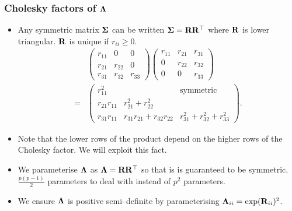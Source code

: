\documentclass{beamer}
\begin{document}
	\begin{frame}
		\frametitle{Cholesky factors of ${\boldsymbol \Lambda}$}
		\begin{itemize}
			\item Any symmetric matrix ${\boldsymbol \Sigma}$ can be written ${\boldsymbol \Sigma} = {\bf R} {\bf R}^\top$
			      where ${\bf R}$ is lower triangular. ${\bf R}$ is unique if $r_{ii} \geq 0$. 
			      \begin{align*}
			      	&\begin{pmatrix}
			      	r_{11}          & 0                                    & 0                                     \\
			      	r_{21}          & r_{22}                             & 0                                     \\
			      	r_{31}          & r_{32}                             & r_{33}                              
			      	\end{pmatrix}
			      	\begin{pmatrix}
			      	r_{11}          & r_{21}                             & r_{31}                              \\
			      	0                 & r_{22}                             & r_{32}                              \\
			      	0                 & 0                                    & r_{33}                              
			      	\end{pmatrix}
			      	\\
			      	=& \begin{pmatrix}
			      	r_{11}^2        &                                      & \text{symmetric}                      \\
			      	r_{21}r_{11} & r_{21}^2 + r_{22}^2 \\
			      	r_{31} r_{11} & r_{31}r_{21} + r_{32} r_{22} & r_{31}^2 + r_{32} ^2 + r_{33}^2 
			      	\end{pmatrix}.
			      \end{align*}
			\item Note that the lower rows of the product depend on the higher rows of the Cholesky factor. We will
			      exploit this fact.
			\item We parameterise ${\boldsymbol \Lambda}$ as ${\boldsymbol \Lambda} = {\bf R} {\bf R}^\top$ so that is is guaranteed to be symmetric.
			      $\frac{p(p-1)}{2}$ parameters to deal with instead of $p^2$ parameters.
			\item We ensure ${\boldsymbol \Lambda}$ is positive semi--definite by parameterising ${\boldsymbol \Lambda}_{ii} = \exp({\bf R}_{ii})^2$.
		\end{itemize}	
	\end{frame}
		
\end{document}
